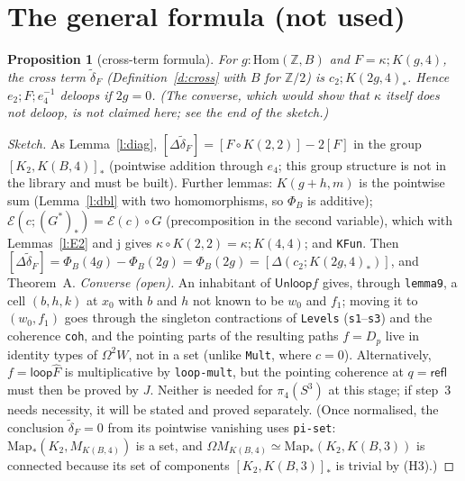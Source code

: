 \documentclass[11pt]{amsart}
\newtheorem{proposition}[theorem]{Proposition}
\theoremstyle{definition}
\theoremstyle{remark}
\newcommand{\Om}{\Omega}
\newcommand{\Map}{\mathrm{Map}_*}
\newcommand{\Z}{\mathbb{Z}}
\newcommand{\code}[1]{\texttt{#1}}
\newcommand{\refl}{\mathsf{refl}}
\newcommand{\lp}{\mathsf{loop}}
\newcommand{\Hom}{\mathrm{Hom}}
\newcommand{\hc}[2]{[#1,#2]_*}
\newcommand{\Unl}{\mathsf{Unloop}}
\newcommand{\cE}{\mathcal E}
\begin{document}
\section{The general formula (not used)}

\begin{proposition}[cross-term formula]\label{p:formula}
For $g:\Hom(\Z,B)$ and $F=\kappa;K(g,4)$, the cross term $\tilde\delta_F$
(Definition~\ref{d:cross} with $B$ for $\Z/2$) is $c_2;K(2g,4)_*$. Hence
$e_2;F;e_4^{-1}$ deloops if $2g=0$. (The converse, which would show that
$\kappa$ itself does not deloop, is \emph{not} claimed here; see the end of
the sketch.)
\end{proposition}
\begin{proof}[Sketch]
As Lemma~\ref{l:diag}, $[\Delta\tilde\delta_F]=[F\circ K(2,2)]-2[F]$ in the
group $\hc{K_2}{K(B,4)}$ (pointwise addition through $e_4$; this group
structure is not in the library and must be built). Further lemmas: $K(g+h,m)$ is the pointwise sum (Lemma~\ref{l:dbl} with two
homomorphisms, so $\Phi_B$ is additive); $\cE(c;(G^*)_*)=\cE(c)\circ G$
(precomposition in the second variable), which with Lemmas~\ref{l:E2} and
j gives $\kappa\circ K(2,2)=\kappa;K(4,4)$; and \code{KFun}. Then
$[\Delta\tilde\delta_F]=\Phi_B(4g)-\Phi_B(2g)=\Phi_B(2g)=[\Delta(c_2;K(2g,4)_*)]$,
and Theorem~A. \emph{Converse (open).} An inhabitant of $\Unl f$ gives,
through \code{lemma9}, a cell $(b,h,k)$ at $x_0$ with $b$ and $h$ not
known to be $w_0$ and $f_1$; moving it to $(w_0,f_1)$ goes through the
singleton contractions of \code{Levels} (\code{s1}--\code{s3}) and the
coherence \code{coh}, and the pointing parts of the resulting paths
$f=D_p$ live in identity types of $\Om^2W$, not in a set (unlike
\code{Mult}, where $c=0$). Alternatively, $f=\lp\hat F$ is multiplicative by
\code{loop-mult}, but the pointing coherence at $q=\refl$ must then be
proved by $J$. Neither is needed for $\pi_4(S^3)$ at this stage; if
step~3 needs necessity, it will be stated and proved separately. (Once normalised, the conclusion
$\tilde\delta_F=0$ from its pointwise vanishing uses \code{pi-set}: $\Map(K_2,M_{K(B,4)})$ is
a set, and $\Om M_{K(B,4)}\simeq\Map(K_2,K(B,3))$ is connected because its
set of components $\hc{K_2}{K(B,3)}$ is trivial by (H3).)
\end{proof}
\end{document}
